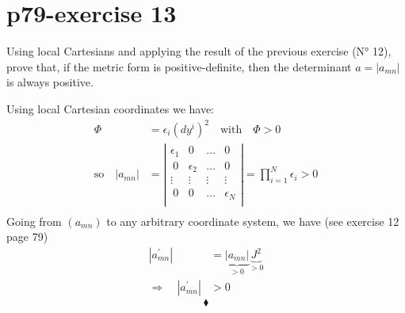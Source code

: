 \section{p79-exercise 13}
\begin{tcolorbox}
Using local Cartesians and applying the result of the previous exercise (N° 12), prove that, if the metric form is positive-definite, then the determinant $a= \left | a_{mn} \right |$ is always positive.
\end{tcolorbox}
Using local Cartesian coordinates we have:
\begin{align}
\Phi &= \epsilon_i (dy^i)^2 \quad \text{with} \quad \Phi > 0\\
\text{so}\quad \left | a_{mn} \right |  &= \left | \begin{array}{cccc}  
\epsilon_1&0&\dots & 0\\
\ 0&\epsilon_2&\dots & 0\\
\vdots&\vdots&\vdots & \vdots\\
\ 0&0&\dots & \epsilon_N\\
\end{array} \right | = \prod_{i=1}^{N}\epsilon_i >0\\
\end{align}
Going from $\left( a_{mn} \right)$ to any arbitrary coordinate system, we have (see exercise 12 page 79) 
\begin{align}
\left | a^{'}_{mn} \right | &= \underbrace{\left | a_{mn} \right |}_{>0}\underbrace{J^2}_{>0}\\
\Rightarrow \quad\left | a^{'}_{mn} \right | &>0
\end{align}
$$\blacklozenge$$
\newpage


